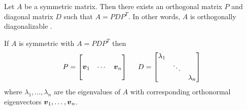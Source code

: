 \begin{theorem}
Let $A$ be a symmetric matrix. Then there exists an orthogonal matrix $P$ and diagonal matrix $D$ such that $A = PDP^T$. In other words, $A$ is orthogonally diagonalizable \cite[p.425]{KN}.
\end{theorem}

\begin{note}
If $A$ is symmetric with $A = PDP^T$ then
$$
P = \begin{bmatrix} & & \\ \boldsymbol{v}_1 & \cdots & \boldsymbol{v}_n \\ & & \end{bmatrix}
\hspace{5mm}
D = \begin{bmatrix} \lambda_1 & & \\ & \ddots & \\ & & \lambda_n \end{bmatrix}
$$
where $\lambda_1,\dots,\lambda_n$ are the eigenvalues of $A$ with corresponding orthonormal eigenvectors $\boldsymbol{v}_1,\dots,\boldsymbol{v}_n$.
\end{note}